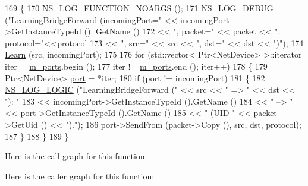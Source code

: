 \begin{DoxyCode}
169 \{
170   \hyperlink{log-macros-disabled_8h_a8f7e4afc291c9d29a65c18ac1f79197b}{NS\_LOG\_FUNCTION\_NOARGS} ();
171   \hyperlink{group__logging_ga413f1886406d49f59a6a0a89b77b4d0a}{NS\_LOG\_DEBUG} (\textcolor{stringliteral}{"LearningBridgeForward (incomingPort="} << incomingPort->GetInstanceTypeId ().
      GetName ()
172                                                        << \textcolor{stringliteral}{", packet="} << packet << \textcolor{stringliteral}{", protocol="}<<protocol
173                                                        << \textcolor{stringliteral}{", src="} << src << \textcolor{stringliteral}{", dst="} << dst << \textcolor{stringliteral}{")"});
174   \hyperlink{classns3_1_1BridgeNetDevice_a9e0a97f4e3b3aa2cd1a3516cb739f721}{Learn} (src, incomingPort);
175 
176   \textcolor{keywordflow}{for} (std::vector< Ptr<NetDevice> >::iterator iter = \hyperlink{classns3_1_1BridgeNetDevice_accf2a9a81b4be28b155d6b5aeeb185be}{m\_ports}.begin ();
177        iter != \hyperlink{classns3_1_1BridgeNetDevice_accf2a9a81b4be28b155d6b5aeeb185be}{m\_ports}.end (); iter++)
178     \{
179       Ptr<NetDevice> \hyperlink{dsdv-manet_8cc_a8e0798404bf2cf5dabb84c5ba9a4f236}{port} = *iter;
180       \textcolor{keywordflow}{if} (port != incomingPort)
181         \{
182           \hyperlink{group__logging_ga88acd260151caf2db9c0fc84997f45ce}{NS\_LOG\_LOGIC} (\textcolor{stringliteral}{"LearningBridgeForward ("} << src << \textcolor{stringliteral}{" => "} << dst << \textcolor{stringliteral}{"): "} 
183                                                   << incomingPort->GetInstanceTypeId ().GetName ()
184                                                   << \textcolor{stringliteral}{" --> "} << port->GetInstanceTypeId ().GetName ()
185                                                   << \textcolor{stringliteral}{" (UID "} << packet->GetUid () << \textcolor{stringliteral}{")."});
186           port->SendFrom (packet->Copy (), src, dst, protocol);
187         \}
188     \}
189 \}
\end{DoxyCode}


Here is the call graph for this function\+:




Here is the caller graph for this function\+:


